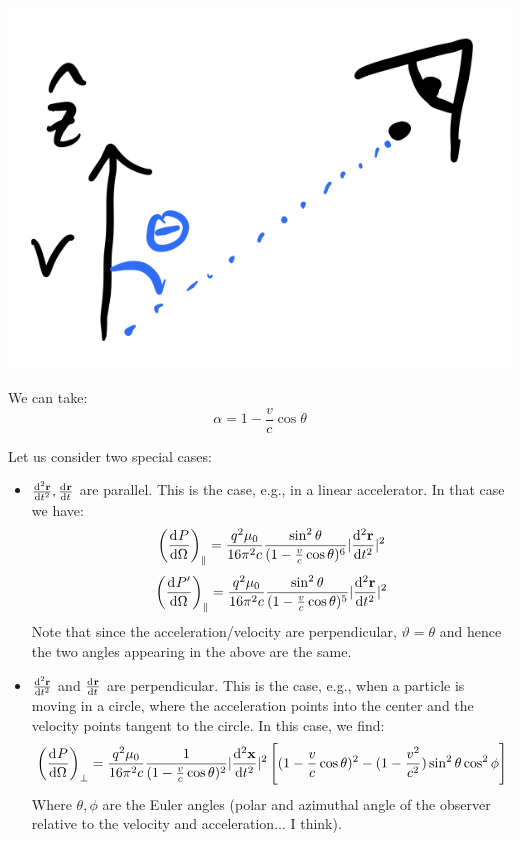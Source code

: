 \begin{center}
    \includegraphics[scale=0.38]{Lectures/Images/lec9-velocangle.png}
\end{center}

We can take:
\begin{equation}
    \alpha = 1 - \frac{v}{c}\cos\theta
\end{equation}

Let us consider two special cases:
\begin{itemize}
    \item $\od[2]{\v{r}}{t}, \od{\v{r}}{t}$ are parallel. This is the case, e.g., in a linear accelerator. In that case we have:
    \begin{equation}
        \left(\dod{P}{\Omega}\right)_{\parallel} = \frac{q^2\mu_0}{16\pi^2 c}\frac{\sin^2\theta}{(1 - \frac{v}{c}\cos\theta)^6}\abs{\dod[2]{\v{r}}{t}}^2
    \end{equation}
    \begin{equation}
        \left(\dod{P'}{\Omega}\right)_{\parallel} = \frac{q^2\mu_0}{16\pi^2 c}\frac{\sin^2\theta}{(1 - \frac{v}{c}\cos\theta)^5}\abs{\dod[2]{\v{r}}{t}}^2
    \end{equation}
    Note that since the acceleration/velocity are perpendicular, $\vartheta = \theta$ and hence the two angles appearing in the above are the same.
    \item  $\od[2]{\v{r}}{t}$ and $\od{\v{r}}{t}$ are perpendicular. This is the case, e.g., when a particle is moving in a circle, where the acceleration points into the center and the velocity points tangent to the circle. In this case, we find:
    \begin{equation}
        \left(\dod{P}{\Omega}\right)_{\perp} = \frac{q^2\mu_0}{16\pi^2 c}\frac{1}{(1-\frac{v}{c}\cos\theta)^2}\abs{\dod[2]{\v{x}}{t}}^2\left[(1 - \frac{v}{c}\cos\theta)^2 - (1 - \frac{v^2}{c^2})\sin^2\theta\cos^2\phi\right]
    \end{equation}
    Where $\theta, \phi$ are the Euler angles (polar and azimuthal angle of the observer relative to the velocity and acceleration... I think).
\end{itemize}

